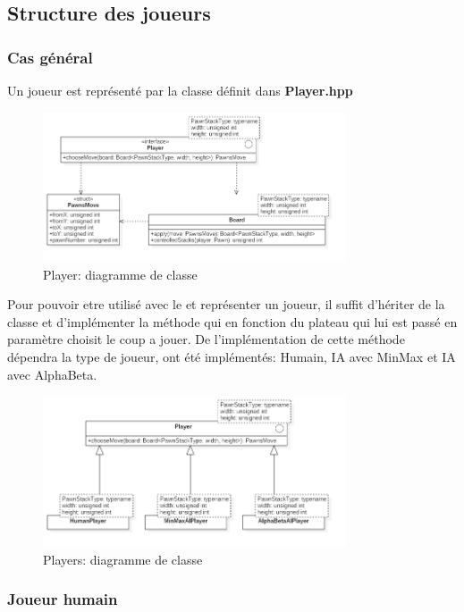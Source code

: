 \documentclass[article, backcover, french, nodocumentinfo]{upmethodology-document}
\begin{document}
		\subsection{Structure des joueurs}
			\subsubsection{Cas général}
					Un joueur est représenté par la classe  définit dans \textbf{Player.hpp}
					\begin{figure}[H]
						\centering
						\includegraphics[width=0.8\textwidth]{figures/PlayerDiagram}
						\caption{Player: diagramme de classe}
						\label{fig:PlayerDiagram}
					\end{figure}
					Pour pouvoir etre utilisé avec le  et représenter un joueur, il suffit d'hériter de la classe  et d'implémenter la méthode  qui en fonction du plateau qui lui est passé en paramètre choisit le coup a jouer. De l'implémentation de cette méthode dépendra la type de joueur, ont été implémentés: Humain, IA avec MinMax et IA avec AlphaBeta.
					\begin{figure}[H]
						\centering
						\includegraphics[width=0.8\textwidth]{figures/PlayersDiagram}
						\caption{Players: diagramme de classe}
						\label{fig:PlayersDiagram}
					\end{figure}
			\subsubsection{Joueur humain}
\end{document}
